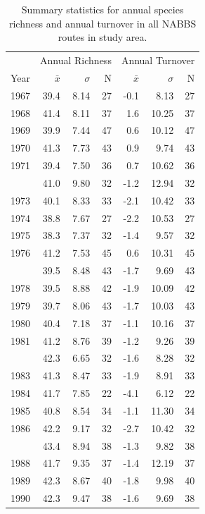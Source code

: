 \documentclass[print]{nuthesis}
\begin{document}
\begin{longtable}{rrrrrrr}
\caption{\label{tab:richTurnTab}Summary statistics for annual species richness and annual turnover in all NABBS routes in study area.}\\
\toprule
\multicolumn{1}{c}{ } & \multicolumn{3}{c}{Annual Richness} & \multicolumn{3}{c}{Annual Turnover} \\
\cmidrule(l{3pt}r{3pt}){2-4} \cmidrule(l{3pt}r{3pt}){5-7}
Year & $\bar{x}$ & $\sigma$ & N & $\bar{x}$ & $\sigma$ & N\\
\midrule
1967 & 39.4 & 8.14 & 27 & -0.1 & 8.13 & 27\\
1968 & 41.4 & 8.11 & 37 & 1.6 & 10.25 & 37\\
1969 & 39.9 & 7.44 & 47 & 0.6 & 10.12 & 47\\
1970 & 41.3 & 7.73 & 43 & 0.9 & 9.74 & 43\\
1971 & 39.4 & 7.50 & 36 & 0.7 & 10.62 & 36\\
\addlinespace
1972 & 41.0 & 9.80 & 32 & -1.2 & 12.94 & 32\\
1973 & 40.1 & 8.33 & 33 & -2.1 & 10.42 & 33\\
1974 & 38.8 & 7.67 & 27 & -2.2 & 10.53 & 27\\
1975 & 38.3 & 7.37 & 32 & -1.4 & 9.57 & 32\\
1976 & 41.2 & 7.53 & 45 & 0.6 & 10.31 & 45\\
\addlinespace
1977 & 39.5 & 8.48 & 43 & -1.7 & 9.69 & 43\\
1978 & 39.5 & 8.88 & 42 & -1.9 & 10.09 & 42\\
1979 & 39.7 & 8.06 & 43 & -1.7 & 10.03 & 43\\
1980 & 40.4 & 7.18 & 37 & -1.1 & 10.16 & 37\\
1981 & 41.2 & 8.76 & 39 & -1.2 & 9.26 & 39\\
\addlinespace
1982 & 42.3 & 6.65 & 32 & -1.6 & 8.28 & 32\\
1983 & 41.3 & 8.47 & 33 & -1.9 & 8.91 & 33\\
1984 & 41.7 & 7.85 & 22 & -4.1 & 6.12 & 22\\
1985 & 40.8 & 8.54 & 34 & -1.1 & 11.30 & 34\\
1986 & 42.2 & 9.17 & 32 & -2.7 & 10.42 & 32\\
\addlinespace
1987 & 43.4 & 8.94 & 38 & -1.3 & 9.82 & 38\\
1988 & 41.7 & 9.35 & 37 & -1.4 & 12.19 & 37\\
1989 & 42.3 & 8.67 & 40 & -1.8 & 9.98 & 40\\
1990 & 42.3 & 9.47 & 38 & -1.6 & 9.69 & 38\\

\end{longtable}
\end{document}

